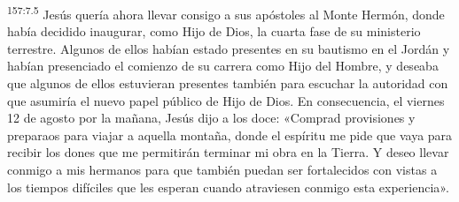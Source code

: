 \par 
\textsuperscript{157:7.5} Jesús quería ahora llevar consigo a sus apóstoles al Monte Hermón, donde había decidido inaugurar, como Hijo de Dios, la cuarta fase de su ministerio terrestre. Algunos de ellos habían estado presentes en su bautismo en el Jordán y habían presenciado el comienzo de su carrera como Hijo del Hombre, y deseaba que algunos de ellos estuvieran presentes también para escuchar la autoridad con que asumiría el nuevo papel público de Hijo de Dios. En consecuencia, el viernes 12 de agosto por la mañana, Jesús dijo a los doce: «Comprad provisiones y preparaos para viajar a aquella montaña, donde el espíritu me pide que vaya para recibir los dones que me permitirán terminar mi obra en la Tierra. Y deseo llevar conmigo a mis hermanos para que también puedan ser fortalecidos con vistas a los tiempos difíciles que les esperan cuando atraviesen conmigo esta experiencia».